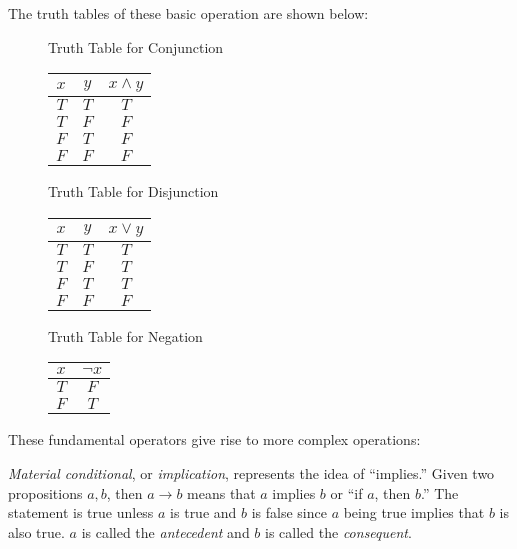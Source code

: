 The truth tables of these basic operation are shown below:

\begin{figure}[H]
    \centering
    Truth Table for Conjunction

    \begin{tabular}{ccc}
        \(x\) & \(y\) & \(x\land y\) \\
        \hline
        \(T\) & \(T\) & \(T\) \\
        \(T\) & \(F\) & \(F\) \\
        \(F\) & \(T\) & \(F\) \\
        \(F\) & \(F\) & \(F\)
    \end{tabular}
\end{figure}

\begin{figure}[H]
    \centering
    Truth Table for Disjunction

    \begin{tabular}{ccc}
        \(x\) & \(y\) & \(x\lor y\) \\
        \hline
        \(T\) & \(T\) & \(T\) \\
        \(T\) & \(F\) & \(T\) \\
        \(F\) & \(T\) & \(T\) \\
        \(F\) & \(F\) & \(F\)
    \end{tabular}
\end{figure}

\begin{figure}[H]
    \centering
    Truth Table for Negation

    \begin{tabular}{cc}
        \(x\) & \(\lnot x\) \\
        \hline
        \(T\) & \(F\) \\
        \(F\) & \(T\) 
    \end{tabular}
\end{figure}

These fundamental operators give rise to more complex operations:

\begin{definition}
    \emph{Material conditional}, or \emph{implication}, represents the idea of ``implies.'' Given two propositions \(a,b\), then \(a\rightarrow b\) means that \(a\) implies \(b\)
    or ``if \(a\), then \(b\).'' The statement is true unless \(a\) is true and \(b\) is false since \(a\) being true implies that \(b\) is also true. \(a\) is called the
    \emph{antecedent} and \(b\) is called the \emph{consequent}.   
\end{definition}

